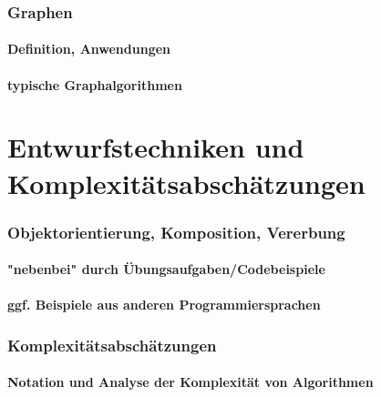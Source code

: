 \documentclass{beamer}
\begin{document}
\section{Graphen}
\subsection{Definition, Anwendungen}
\subsection{typische Graphalgorithmen}

\part{Entwurfstechniken und Komplexitätsabschätzungen}

\section{Objektorientierung, Komposition, Vererbung}
\subsection{"nebenbei" durch Übungsaufgaben/Codebeispiele}
\subsection{ggf. Beispiele aus anderen Programmiersprachen}

\section{Komplexitätsabschätzungen}
\subsection{Notation und Analyse der Komplexität von Algorithmen}

\begin{frame}
\end{frame}
\end{document}
